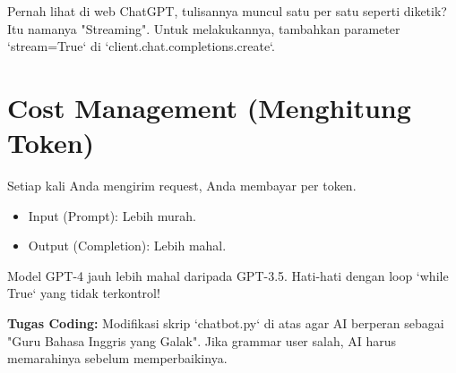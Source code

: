 Pernah lihat di web ChatGPT, tulisannya muncul satu per satu seperti diketik? Itu namanya "Streaming".
Untuk melakukannya, tambahkan parameter `stream=True` di `client.chat.completions.create`.

\section{Cost Management (Menghitung Token)}

Setiap kali Anda mengirim request, Anda membayar per token.

\begin{itemize}
    \item Input (Prompt): Lebih murah.
    \item Output (Completion): Lebih mahal.
\end{itemize}

Model GPT-4 jauh lebih mahal daripada GPT-3.5. Hati-hati dengan loop `while True` yang tidak terkontrol!

\begin{exercisebox}
\textbf{Tugas Coding:}
Modifikasi skrip `chatbot.py` di atas agar AI berperan sebagai "Guru Bahasa Inggris yang Galak". Jika grammar user salah, AI harus memarahinya sebelum memperbaikinya.
\end{exercisebox}
